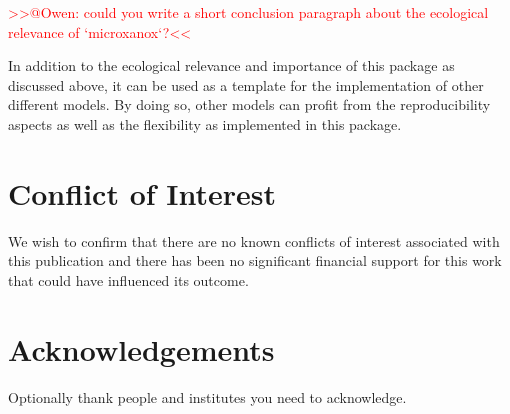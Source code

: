 \documentclass[]{elsarticle} %
\begin{document}
\textcolor{red}{{>>@Owen: could you write a short conclusion paragraph about the ecological relevance of `microxanox`?<<}}

In addition to the ecological relevance and importance of this package
as discussed above, it can be used as a template for the implementation
of other different models. By doing so, other models can profit from the
reproducibility aspects as well as the flexibility as implemented in
this package.

\hypertarget{conflict-of-interest}{%
\section{Conflict of Interest}\label{conflict-of-interest}}

We wish to confirm that there are no known conflicts of interest
associated with this publication and there has been no significant
financial support for this work that could have influenced its outcome.

\hypertarget{acknowledgements}{%
\section{Acknowledgements}\label{acknowledgements}}

Optionally thank people and institutes you need to acknowledge.

\renewcommand\refname{References}

\end{document}
